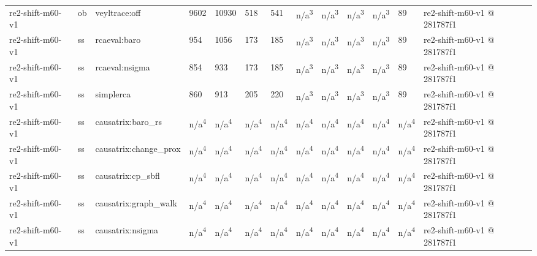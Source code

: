 \begin{table}[t]
\begin{tabular}{lllllllllllll}
re2-shift-m60-v1 & ob & veyltrace:off & 9602 & 10930 & 518 & 541 & n/a\textsuperscript{3} & n/a\textsuperscript{3} & n/a\textsuperscript{3} & n/a\textsuperscript{3} & 89 & re2-shift-m60-v1 @ 281787f1 \\
re2-shift-m60-v1 & ss & rcaeval:baro & 954 & 1056 & 173 & 185 & n/a\textsuperscript{3} & n/a\textsuperscript{3} & n/a\textsuperscript{3} & n/a\textsuperscript{3} & 89 & re2-shift-m60-v1 @ 281787f1 \\
re2-shift-m60-v1 & ss & rcaeval:nsigma & 854 & 933 & 173 & 185 & n/a\textsuperscript{3} & n/a\textsuperscript{3} & n/a\textsuperscript{3} & n/a\textsuperscript{3} & 89 & re2-shift-m60-v1 @ 281787f1 \\
re2-shift-m60-v1 & ss & simplerca & 860 & 913 & 205 & 220 & n/a\textsuperscript{3} & n/a\textsuperscript{3} & n/a\textsuperscript{3} & n/a\textsuperscript{3} & 89 & re2-shift-m60-v1 @ 281787f1 \\
re2-shift-m60-v1 & ss & causatrix:baro\_rs & n/a\textsuperscript{4} & n/a\textsuperscript{4} & n/a\textsuperscript{4} & n/a\textsuperscript{4} & n/a\textsuperscript{4} & n/a\textsuperscript{4} & n/a\textsuperscript{4} & n/a\textsuperscript{4} & n/a\textsuperscript{4} & re2-shift-m60-v1 @ 281787f1 \\
re2-shift-m60-v1 & ss & causatrix:change\_prox & n/a\textsuperscript{4} & n/a\textsuperscript{4} & n/a\textsuperscript{4} & n/a\textsuperscript{4} & n/a\textsuperscript{4} & n/a\textsuperscript{4} & n/a\textsuperscript{4} & n/a\textsuperscript{4} & n/a\textsuperscript{4} & re2-shift-m60-v1 @ 281787f1 \\
re2-shift-m60-v1 & ss & causatrix:cp\_sbfl & n/a\textsuperscript{4} & n/a\textsuperscript{4} & n/a\textsuperscript{4} & n/a\textsuperscript{4} & n/a\textsuperscript{4} & n/a\textsuperscript{4} & n/a\textsuperscript{4} & n/a\textsuperscript{4} & n/a\textsuperscript{4} & re2-shift-m60-v1 @ 281787f1 \\
re2-shift-m60-v1 & ss & causatrix:graph\_walk & n/a\textsuperscript{4} & n/a\textsuperscript{4} & n/a\textsuperscript{4} & n/a\textsuperscript{4} & n/a\textsuperscript{4} & n/a\textsuperscript{4} & n/a\textsuperscript{4} & n/a\textsuperscript{4} & n/a\textsuperscript{4} & re2-shift-m60-v1 @ 281787f1 \\
re2-shift-m60-v1 & ss & causatrix:nsigma & n/a\textsuperscript{4} & n/a\textsuperscript{4} & n/a\textsuperscript{4} & n/a\textsuperscript{4} & n/a\textsuperscript{4} & n/a\textsuperscript{4} & n/a\textsuperscript{4} & n/a\textsuperscript{4} & n/a\textsuperscript{4} & re2-shift-m60-v1 @ 281787f1 \\

\end{tabular}
\end{table}
